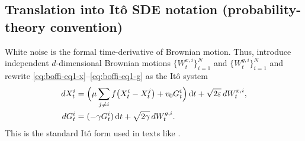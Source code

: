 \documentclass[11pt]{article}
\newcommand{\1}{\mathbbm{1}}
\newcommand{\dt}{\,\mathrm{d}t}
\theoremstyle{plain}
\theoremstyle{definition}
\theoremstyle{remark}
\begin{document}
\subsection{Translation into It\^o SDE notation (probability-theory convention)}
White noise is the formal time-derivative of Brownian motion. Thus, introduce independent $d$-dimensional
Brownian motions $\{W_t^{x,i}\}_{i=1}^N$ and $\{W_t^{g,i}\}_{i=1}^N$ and rewrite
\eqref{eq:boffi-eq1-x}--\eqref{eq:boffi-eq1-g} as the It\^o system
\begin{align}
dX_t^i
&=
\Bigl(\mu\sum_{j\neq i} f\bigl(X_t^i - X_t^j\bigr) + v_0 G_t^i\Bigr)\dt
+ \sqrt{2\varepsilon}\,dW_t^{x,i},
\label{eq:ito-x}\\
dG_t^i
&=
(-\gamma G_t^i)\dt + \sqrt{2\gamma}\,dW_t^{g,i}.
\label{eq:ito-g}
\end{align}
This is the standard It\^o form used in texts like \citet{oksendal2013sde}. 
\end{document}
